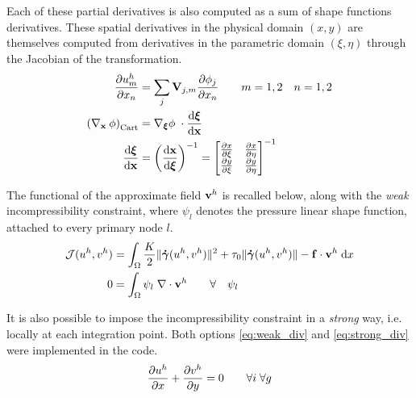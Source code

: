 \documentclass[11 pt]{report}
\begin{document}
Each of these partial derivatives is also computed as a sum of shape functions derivatives. These spatial derivatives in the physical domain $(x,y)$ are themselves computed from derivatives in the parametric domain $(\xi, \eta)$ through the Jacobian of the transformation.
\begin{align}
    \pdv{u^h_m}{x_n} &= \sum_j \mathbf{V}_{j,m} \pdv{\phi_j}{x_n} \qquad m=1,2 \quad n=1,2\\
    \left(\nabla_{\mathbf{x}} \: \phi\right)_{\text{Cart}} &= \nabla_{\boldsymbol\xi} \phi \; \cdot \dv{\boldsymbol \xi}{\mathbf{x}}\\
    \dv{\boldsymbol \xi}{\mathbf{x}} &= \left(\dv{\mathbf{x}}{\boldsymbol \xi}\right)^{-1} = 
    \begin{bmatrix}
        \pdv{x}{\xi} & \pdv{x}{\eta}\\
        \pdv{y}{\xi} & \pdv{y}{\eta}\\
    \end{bmatrix}^{-1}
\end{align}

The functional of the approximate field $\mathbf{v}^h$ is recalled below, along with the \textit{weak} incompressibility constraint, where $\psi_l$ denotes the pressure linear shape function, attached to every primary node $l$.
\begin{align}
    \mathcal{J}(u^h, v^h) &= \int_{\Omega} \frac{K}{2} \|\boldsymbol{\dot \gamma}(u^h, v^h)\|^2 + \tau_0 \|\boldsymbol{\dot \gamma}(u^h, v^h)\| - \mathbf{f} \cdot \mathbf{v}^h \; \dd x\\
    0 &= \int_{\Omega} \psi_l \; \nabla \cdot \mathbf{v}^h \qquad \forall \quad \psi_l \label{eq:weak_div}
\end{align}

It is also possible to impose the incompressibility constraint in a \textit{strong} way, i.e. locally at each integration point\cite{Bleyer}. Both options \eqref{eq:weak_div} and \eqref{eq:strong_div} were implemented in the code.
\begin{equation}
    \pdv{u^h}{x} + \pdv{v^h}{y} = 0 \qquad \forall i \; \forall g \label{eq:strong_div}
\end{equation}
\end{document}
